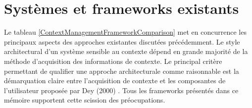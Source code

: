 \section{Systèmes et frameworks existants}

Le tableau \ref{ContextManagementFrameworkComparison} met en concurrence les
principaux aspects des approches existantes discutées précédemment. Le style
architectural d'un système sensible au contexte dépend en grande majorité de la
méthode d'acquisition des informations de contexte. Le principal critère
permettant de qualifier une approche architecturale comme raisonnable est la
démarquation claire entre l'acquisition de contexte et les composantes de
l'utilisateur proposée par Dey (2000) \cite{dey_providing_2000}. Tous les
frameworks présentés dans ce mémoire supportent cette scission des
préocupations.

